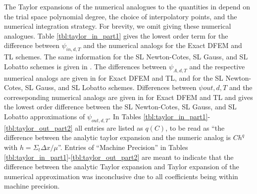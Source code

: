 The Taylor expansions of the numerical analogues to the quantities in  depend on the trial space polynomial degree, the choice of interpolatory points, and the numerical integration strategy. 
For brevity, we omit giving these numerical analogues.
Table \ref{tbl:taylor_in_part1} gives the lowest order term for the difference between  $\psi_{in,d,T}$ and the numerical analogs
for the Exact DFEM and TL schemes.  
The same information for the SL Newton-Cotes, SL Gauss, and SL Lobatto schemes is given in .
The differences between $\psi_{A,d,T}$ and the respective numerical analogs are given in  for Exact DFEM and TL,
and  for the SL Newton-Cotes, SL Gauss, and SL Lobatto schemes.
Differences between $\psi{out,d,T}$ and the correseponding numerical analogs are given in  for Exact DFEM and TL  and 
 gives the lowest order difference between the SL Newton-Cotes, SL Gauss, and SL Lobatto approximations of $\psi_{out,d,T}$.
In Tables \ref{tbl:taylor_in_part1}-\ref{tbl:taylor_out_part2} all entries are listed as
$q(C)$, to be read as ``the difference between the analytic taylor expansion and the numeric analog is $C h^q$ with $h=\Sigma_t \Delta x / \mu$''.
Entries of ``Machine Precision'' in Tables \ref{tbl:taylor_in_part1}-\ref{tbl:taylor_out_part2} are meant to indicate that the difference between
the analytic Taylor expansion and Taylor expansion of the numerical approximation was inconclusive due to all coefficients being within machine precision.
